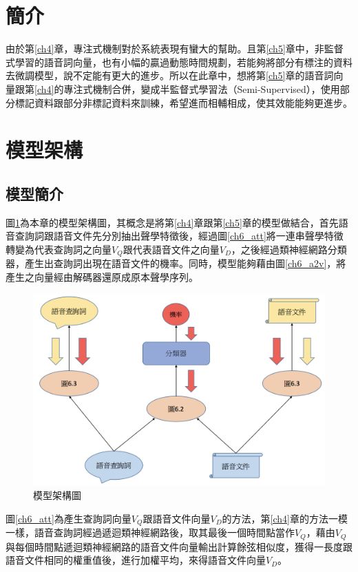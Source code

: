 \label{ch6}
\section{簡介}
由於第\ref{ch4}章，專注式機制對於系統表現有蠻大的幫助。且第\ref{ch5}章中，非監督式學習的語音詞向量，也有小幅的贏過動態時間規劃，若能夠將部分有標注的資料去微調模型，說不定能有更大的進步。所以在此章中，想將第\ref{ch5}章的語音詞向量跟第\ref{ch4}的專注式機制合併，變成半監督式學習法（Semi-Supervised），使用部分標記資料跟部分非標記資料來訓練，希望進而相輔相成，使其效能能夠更進步。
\section{模型架構}
\subsection{模型簡介}
圖\ref{ch6_model}為本章的模型架構圖，其概念是將第\ref{ch4}章跟第\ref{ch5}章的模型做結合，首先語音查詢詞跟語音文件先分別抽出聲學特徵後，經過圖\ref{ch6_att}將一連串聲學特徵轉變為代表查詢詞之向量$V_Q$跟代表語音文件之向量$V_D$，之後經過類神經網路分類器，產生出查詢詞出現在語音文件的機率。同時，模型能夠藉由圖\ref{ch6_a2v}，將產生之向量經由解碼器還原成原本聲學序列。

\begin{figure}
\centering
\includegraphics[scale=0.5]{images/ch6_model.png} 
\caption{模型架構圖}
\label{ch6_model}
\end{figure}
圖\ref{ch6_att}為產生查詢詞向量$V_Q$跟語音文件向量$V_D$的方法，第\ref{ch4}章的方法一模一樣，語音查詢詞經過遞迴類神經網路後，取其最後一個時間點當作$V_Q$，藉由$V_Q$與每個時間點遞迴類神經網路的語音文件向量輸出計算餘弦相似度，獲得一長度跟語音文件相同的權重值後，進行加權平均，來得語音文件向量$V_D$。

